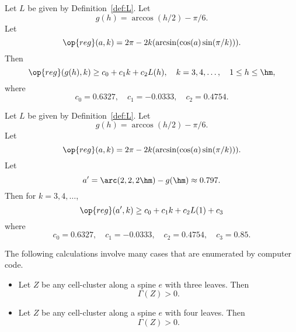 \begin{calculation}\label{calc:cc:alin}\guid{}
Let $L$ be given by Definition~\ref{def:L}.
Let
\begin{displaymath}
g(h) = \arccos(h/2) - \pi/6.
\end{displaymath}
Let
\begin{displaymath}
\op{reg}(a,k) = 2\pi - 2 k (\arcsin(\cos(a)\sin(\pi/k))).
\end{displaymath}
Then
\begin{displaymath}
\op{reg}(g(h),k) \ge c_0 + c_1 k + c_2 L(h),\quad
k = 3,4,\ldots,\quad 1\le h\le \hm,
\end{displaymath}
where
\begin{displaymath}c_0 = 0.6327,\quad c_1 = -0.0333,\quad c_2 =
0.4754.\end{displaymath}
\end{calculation}

\begin{calculation}\label{calc:cc:alin2}\guid{}
Let $L$ be given by Definition~\ref{def:L}.
Let
\begin{displaymath}
g(h) = \arccos(h/2) - \pi/6.
\end{displaymath}
Let
\begin{displaymath}
\op{reg}(a,k) = 2\pi - 2 k (\arcsin(\cos(a)\sin(\pi/k))).
\end{displaymath}
Let
\begin{displaymath}a'=\arc(2,2,2\hm)-g(\hm) \approx
0.797.\end{displaymath} Then for $k=3,4,\ldots$,
\begin{displaymath}\op{reg}(a',k) \ge c_0 + c_1 k + c_2 L(1) +
c_3\end{displaymath}
where 
\begin{displaymath}c_0 = 0.6327,\quad c_1 = -0.0333,\quad c_2 =
0.4754,\quad c_3 = 0.85.\end{displaymath}
\end{calculation}

\begin{calculation}\label{calc:shorts}
The following calculations involve many cases that are enumerated by
computer code.
\begin{itemize}
\item {} Let $Z$ be any cell-cluster along a spine $e$
with three leaves.  Then
\begin{displaymath}
\Gamma(Z)> 0.
\end{displaymath}
\item {} Let $Z$ be any cell-cluster along a spine $e$
with four leaves.  Then
\begin{displaymath}
\Gamma(Z)> 0.
\end{displaymath}
\end{itemize}
\end{calculation}